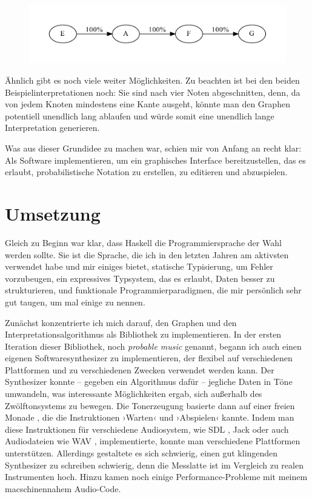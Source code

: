 \documentclass[a4paper,twocolumn]{article}
\begin{document}
\begin{figure}[h]
\includegraphics[width=.5\textwidth]{example-graph-interpretation2}
\end{figure}

Ähnlich gibt es noch viele weiter Möglichkeiten. Zu beachten ist bei den beiden
Beispielinterpretationen noch: Sie sind nach vier Noten abgeschnitten, denn, da
von jedem Knoten mindestens eine Kante ausgeht, könnte man den Graphen
potentiell unendlich lang ablaufen und würde somit eine unendlich lange
Interpretation generieren.

Was aus dieser Grundidee zu machen war, schien mir von Anfang an recht klar: Als
Software implementieren, um ein graphisches Interface bereitzustellen, das es
erlaubt, probabilistische Notation zu erstellen, zu editieren und abzuspielen.

\section*{Umsetzung}

Gleich zu Beginn war klar, dass Haskell die Programmiersprache der Wahl werden
sollte. Sie ist die Sprache, die ich in den letzten Jahren am aktivsten
verwendet habe und mir einiges bietet, statische Typisierung, um Fehler
vorzubeugen, ein expressives Typsystem, das es erlaubt, Daten besser zu
strukturieren, und funktionale Programmierparadigmen, die mir persönlich sehr
gut taugen, um mal einige zu nennen.

Zunächst konzentrierte ich mich darauf, den Graphen und den
Interpretationsalgorithmus als Bibliothek zu implementieren. In der ersten
Iteration dieser Bibliothek, noch {\it probable music} genannt, begann ich auch
einen eigenen Softwaresynthesizer zu implementieren, der flexibel auf
verschiedenen Plattformen und zu verschiedenen Zwecken verwendet werden kann.
Der Synthesizer konnte -- gegeben ein Algorithmus dafür -- jegliche Daten in
Töne umwandeln, was interessante Möglichkeiten ergab, sich außerhalb des
Zwölftonsystems zu bewegen. Die Tonerzeugung basierte dann auf einer freien
Monade \cite{free_monad}, die die Instruktionen ›Warten‹ und ›Abspielen‹ kannte.
Indem man diese Instruktionen für verschiedene Audiosystem, wie SDL \cite{sdl},
Jack \cite{jack} oder auch Audiodateien wie WAV \cite{wav}, implementierte,
konnte man verschiedene Plattformen unterstützen. Allerdings gestaltete es sich
schwierig, einen gut klingenden Synthesizer zu schreiben schwierig, denn die
Messlatte ist im Vergleich zu realen Instrumenten hoch. Hinzu kamen noch einige
Performance-Probleme mit meinem macschinennahem Audio-Code.
\end{document}
